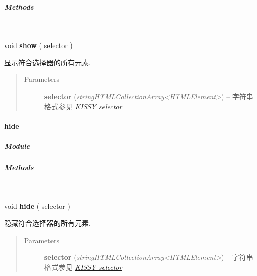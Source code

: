 \documentclass[letterpaper,10pt,english]{sphinxmanual}
\begin{document}
\subparagraph{Methods}
\label{api/core/dom/show:methods}

\begin{fulllineitems}
\label{api/core/dom/show:DOM.show}~
\begin{DUlineblock}{0em}
\item[] void \textbf{show} ( selector )
\item[] 显示符合选择器的所有元素.
\end{DUlineblock}
\begin{quote}\begin{description}
\item[{Parameters}] \leavevmode
\textbf{selector} (\emph{string\textbar{}HTMLCollection\textbar{}Array\textless{}HTMLElement\textgreater{}}) -- 字符串格式参见 {\hyperref[api/core/dom/selector:dom-selector]{\emph{KISSY selector}}}

\end{description}\end{quote}

\end{fulllineitems}



\paragraph{hide}
\label{api/core/dom/hide:hide}\label{api/core/dom/hide::doc}

\subparagraph{Module}
\label{api/core/dom/hide:module}\begin{quote}

{\hyperref[api/core/dom/index:module-DOM]{}}
\end{quote}


\subparagraph{Methods}
\label{api/core/dom/hide:methods}

\begin{fulllineitems}
\label{api/core/dom/hide:DOM.hide}~
\begin{DUlineblock}{0em}
\item[] void \textbf{hide} ( selector )
\item[] 隐藏符合选择器的所有元素.
\end{DUlineblock}
\begin{quote}\begin{description}
\item[{Parameters}] \leavevmode
\textbf{selector} (\emph{string\textbar{}HTMLCollection\textbar{}Array\textless{}HTMLElement\textgreater{}}) -- 字符串格式参见 {\hyperref[api/core/dom/selector:dom-selector]{\emph{KISSY selector}}}

\end{description}\end{quote}

\end{fulllineitems}
\end{document}
